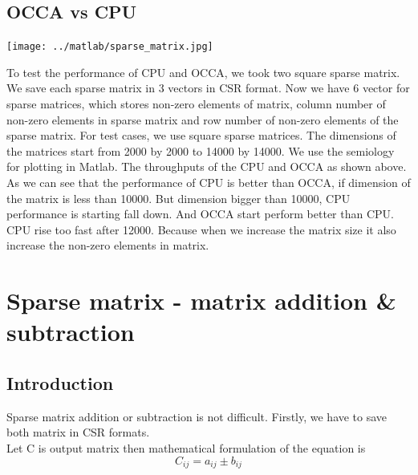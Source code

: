 \subsection{OCCA vs CPU}
\begin{center}
	\texttt{[image: ../matlab/sparse\_matrix.jpg]}
\end{center}
To test the performance of CPU and OCCA, we took two square sparse matrix. We save each sparse matrix in 3 vectors in CSR format. Now we have 6 vector for sparse matrices, which stores non-zero elements of matrix, column number of non-zero elements in sparse matrix and row number of non-zero elements of the sparse matrix. For test cases, we use square sparse matrices. The dimensions of the matrices start from 2000 by 2000 to  14000 by 14000. We use the semiology for plotting in Matlab. The throughputs of the CPU and OCCA as shown above. As we can see that the performance of CPU is better than OCCA, if dimension of the matrix is less than 10000. But dimension bigger than 10000, CPU performance is starting fall down. And OCCA start perform better than CPU. CPU rise too fast after 12000. Because when we increase the matrix size it also increase the non-zero elements in matrix.

\section{Sparse matrix - matrix addition \& subtraction}
\subsection{Introduction}
Sparse matrix addition or subtraction is not difficult. Firstly, we have to save both matrix in CSR formats.\\
Let C is output matrix then mathematical formulation of the equation is\\
\begin{equation}
	C_{ij}=a_{ij} \pm b_{ij}
\end{equation}

